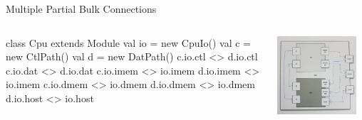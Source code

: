 \documentclass[xcolor=pdflatex,dvipsnames,table]{beamer}
\begin{document}
\begin{frame}[fragile]{Multiple Partial Bulk Connections}
\begin{columns}

\begin{scala}
class Cpu extends Module {
  val io = new CpuIo()
  val c  = new CtlPath()
  val d  = new DatPath()
  c.io.ctl  <> d.io.ctl
  c.io.dat  <> d.io.dat
  c.io.imem <> io.imem
  d.io.imem <> io.imem
  c.io.dmem <> io.dmem
  d.io.dmem <> io.dmem
  d.io.host <> io.host
}
\end{scala}


\begin{center}
\includegraphics[width=0.9\textwidth]{../tutorial/figs/cpu.png} 
\end{center}

\end{columns}
\end{frame}
\end{document}
